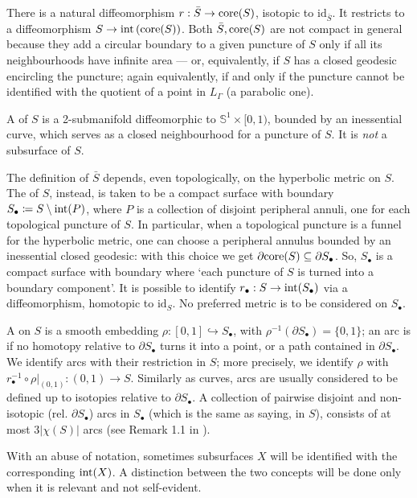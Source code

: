 There is a natural diffeomorphism $r:\bar S\rightarrow \mathrm{core}(S)$, isotopic to $\mathrm{id}_{\bar S}$. It restricts to a diffeomorphism $S\rightarrow \mathrm{int}\left(\mathrm{core}(S)\right)$. Both $\bar S,\mathrm{core}(S)$ are not compact in general because they add a circular boundary to a given puncture of $S$ only if all its neighbourhoods have infinite area --- or, equivalently, if $S$ has a closed geodesic encircling the puncture; again equivalently, if and only if the puncture cannot be identified with the quotient of a point in $L_\Gamma$ (a parabolic one).

A  of $S$ is a 2-submanifold diffeomorphic to $\mathbb S^1\times [0,1)$, bounded by an inessential curve, which serves as a closed neighbourhood for a puncture of $S$. It is \emph{not} a subsurface of $S$.

The definition of $\bar S$ depends, even topologically, on the hyperbolic metric on $S$. The  of $S$, instead, is taken to be a compact surface with boundary $S_\bullet \coloneqq S\setminus \mathrm{int}(P)$, where $P$ is a collection of disjoint peripheral annuli, one for each topological puncture of $S$. In particular, when a topological puncture is a funnel for the hyperbolic metric, one can choose a peripheral annulus bounded by an inessential closed geodesic: with this choice we get $\partial\mathrm{core}(S)\subseteq \partial S_\bullet$. So, $S_\bullet$ is a compact surface with boundary where `each puncture of $S$ is turned into a boundary component'. It is possible to identify $r_\bullet:S\rightarrow \mathrm{int}(S_\bullet)$ via a diffeomorphism, homotopic to $\mathrm{id}_S$. No preferred metric is to be considered on $S_\bullet$.

A  on $S$ is a smooth embedding $\rho:[0,1]\hookrightarrow S_\bullet$, with $\rho^{-1}(\partial S_\bullet)=\{0,1\}$; an arc is  if no homotopy relative to $\partial S_\bullet$ turns it into a point, or a path contained in $\partial S_\bullet$. We identify arcs with their restriction in $S$; more precisely, we identify $\rho$ with $r_\bullet^{-1}\circ \rho|_{(0,1)}:(0,1)\rightarrow S$. Similarly as curves, arcs are usually considered to be defined up to isotopies relative to $\partial S_\bullet$. A collection of pairwise disjoint and non-isotopic (rel. $\partial S_\bullet$) arcs in $S_\bullet$ (which is the same as saying, in $S$), consists of at most $3|\chi(S)|$ arcs (see Remark 1.1 in \cite{przytycki}).

With an abuse of notation, sometimes subsurfaces $X$ will be identified with the corresponding $\mathrm{int}(X)$. A distinction between the two concepts will be done only when it is relevant and not self-evident.

